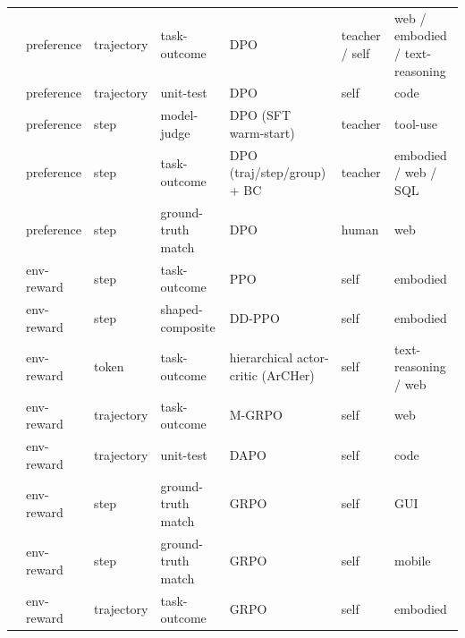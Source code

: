 \begin{table}[htbp]
{\begin{tabular}{@{}lllllll@{}}
\cite{Son24}   & preference & trajectory & task-outcome       & DPO                                 & teacher / self& web / embodied / text-reasoning       \\
\cite{Da25}    & preference & trajectory & unit-test          & DPO                                 & self          & code                                  \\
\cite{Che24k}  & preference & step       & model-judge        & DPO (SFT warm-start)                & teacher       & tool-use                              \\
\cite{Gao25c}  & preference & step       & task-outcome       & DPO (traj/step/group) + BC          & teacher       & embodied / web / SQL                  \\
\cite{Liu25z}  & preference & step       & ground-truth match & DPO                                 & human         & web                                   \\
\midrule
\cite{Car23}   & env-reward & step       & task-outcome       & PPO                                 & self          & embodied                              \\
\cite{Szo23}   & env-reward & step       & shaped-composite   & DD-PPO                              & self          & embodied                              \\
\cite{Zho24f}  & env-reward & token      & task-outcome       & hierarchical actor-critic (ArCHer)  & self          & text-reasoning / web                  \\
\cite{Wei25}   & env-reward & trajectory & task-outcome       & M-GRPO                              & self          & web                                   \\
\cite{Gol25}   & env-reward & trajectory & unit-test          & DAPO                                & self          & code                                  \\
\cite{Luo25b}  & env-reward & step       & ground-truth match & GRPO                                & self          & GUI                                   \\
\cite{Zha25an} & env-reward & step       & ground-truth match & GRPO                                & self          & mobile                                \\
\cite{Li25aa}  & env-reward & trajectory & task-outcome       & GRPO                                & self          & embodied                              \\

\end{tabular}}
\end{table}
